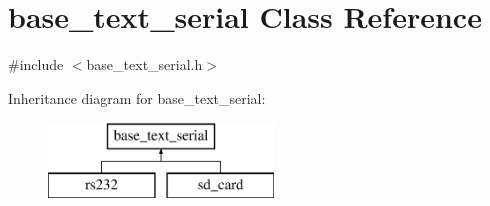\hypertarget{classbase__text__serial}{\section{base\-\_\-text\-\_\-serial Class Reference}
\label{classbase__text__serial}
}


{\ttfamily \#include $<$base\-\_\-text\-\_\-serial.\-h$>$}

Inheritance diagram for base\-\_\-text\-\_\-serial\-:\begin{figure}[H]
\begin{center}
\leavevmode
\includegraphics[height=2.000000cm]{classbase__text__serial}
\end{center}
\end{figure}
